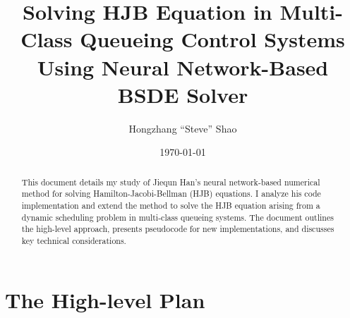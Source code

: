 \documentclass[10pt]{article}
\title{Solving HJB Equation in Multi-Class Queueing Control Systems Using Neural Network-Based BSDE Solver}
\author{Hongzhang ``Steve'' Shao}
\date{\today}
\begin{document}
\maketitle

\begin{abstract}
This document details my study of Jiequn Han's neural network-based numerical method for solving Hamilton-Jacobi-Bellman (HJB) equations. 
I analyze his code implementation and extend the method to solve the HJB equation arising from a dynamic scheduling problem in multi-class queueing systems. 
The document outlines the high-level approach, presents pseudocode for new implementations, and discusses key technical considerations.
\end{abstract}

\vspace{1em}

\tableofcontents



\pagebreak

\section{The High-level Plan}
\end{document}
